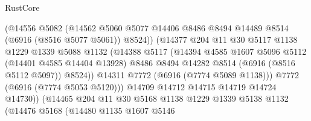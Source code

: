 \begin{lexlean}{RustCore}
\begin{coremodule}
                                (@14556
                                  @5082
                                  (@14562
                                    @5060
                                    @5077
                                    @14406
                                    @8486
                                    @8494
                                    @14489
                                    @8514
                                    (@6916 (@8516 @5077 @5061))
                                    @8524))
                                (@14377
                                  @204
                                  @11
                                  @30
                                  @5117
                                  @1138
                                  @1229
                                  @1339
                                  @5088
                                  @1132
                                  (@14388
                                    @5117
                                    (@14394
                                      @4585
                                      @1607
                                      @5096
                                      @5112
                                      (@14401 @4585 @14404 @13928)
                                      @8486
                                      @8494
                                      @14282
                                      @8514
                                      (@6916 (@8516 @5112 @5097))
                                      @8524))
                                  @14311
                                  @7772
                                  (@6916 (@7774 @5089 @1138)))
                                @7772
                                (@6916 (@7774 @5053 @5120)))
                              @14709
                              @14712
                              @14715
                              @14719
                              @14724
                              @14730))
                          (@14465
                            @204
                            @11
                            @30
                            @5168
                            @1138
                            @1229
                            @1339
                            @5138
                            @1132
                            (@14476
                              @5168
                              (@14480
                                @1135
                                @1607
                                @5146

\end{coremodule}
\end{lexlean}

